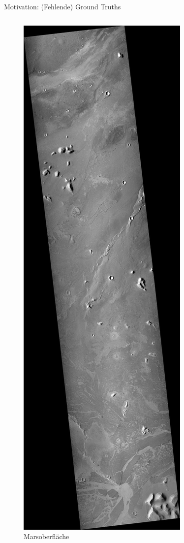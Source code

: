 \documentclass[9pt]{beamer}
\begin{document}
\begin{frame}{Motivation: (Fehlende) Ground Truths}
\begin{columns}
\begin{column}{.3\textwidth}
\begin{figure}[H]
			\includegraphics[height=.6\textheight, keepaspectratio]{P03-2.jpg}
			\caption{Marsoberfläche\footnotemark[1]}
		\end{figure}
	\end{column}
\end{columns}
\end{frame}
\end{document}
